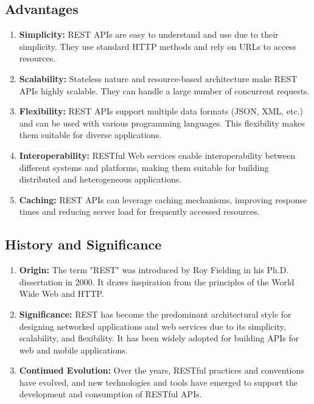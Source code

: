 \documentclass[11pt]{article}
\begin{document}
\subsection{Advantages}

\begin{enumerate}
    \item \textbf{Simplicity:} REST APIs are easy to understand and use due to their simplicity. They use standard HTTP methods and rely on URLs to access resources.

    \item \textbf{Scalability:} Stateless nature and resource-based architecture make REST APIs highly scalable. They can handle a large number of concurrent requests.

    \item \textbf{Flexibility:} REST APIs support multiple data formats (JSON, XML, etc.) and can be used with various programming languages. This flexibility makes them suitable for diverse applications.

    \item \textbf{Interoperability:} RESTful Web services enable interoperability between different systems and platforms, making them suitable for building distributed and heterogeneous applications.

    \item \textbf{Caching:} REST APIs can leverage caching mechanisms, improving response times and reducing server load for frequently accessed resources.

\end{enumerate}

\subsection{History and Significance}

\begin{enumerate}
    \item \textbf{Origin:} The term "REST" was introduced by Roy Fielding in his Ph.D. dissertation in 2000. It draws inspiration from the principles of the World Wide Web and HTTP.

    \item \textbf{Significance:} REST has become the predominant architectural style for designing networked applications and web services due to its simplicity, scalability, and flexibility. It has been widely adopted for building APIs for web and mobile applications.

    \item \textbf{Continued Evolution:} Over the years, RESTful practices and conventions have evolved, and new technologies and tools have emerged to support the development and consumption of RESTful APIs.

\end{enumerate}
\end{document}
